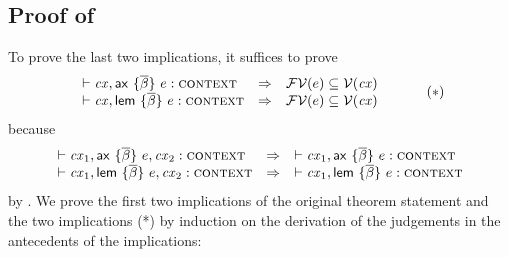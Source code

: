 \subsection*{Proof of }

To prove the last two implications, it suffices to prove
\[
\begin{array}{l@{\ \ \IMPLIES\ \ }l}
\cxwf{\snoc{\cx}{\axO}}  & \efvar{\expr}\subseteq\cxvarO \\
\cxwf{\snoc{\cx}{\lemO}} & \efvar{\expr}\subseteq\cxvarO
\end{array}
\hspace{3em}(*)
\]
because
\[
\begin{array}{l@{\ \ \IMPLIES\ \ }l}
\cxwf{\cx_1,\axO,\cx_2}  & \cxwf{\snoc{\cx_1}{\axO}} \\
\cxwf{\cx_1,\lemO,\cx_2} & \cxwf{\snoc{\cx_1}{\lemO}}
\end{array}
\]
by . We prove the first two implications of the original
theorem statement and the two implications (*) by induction on the derivation
of the judgements in the antecedents of the implications:

